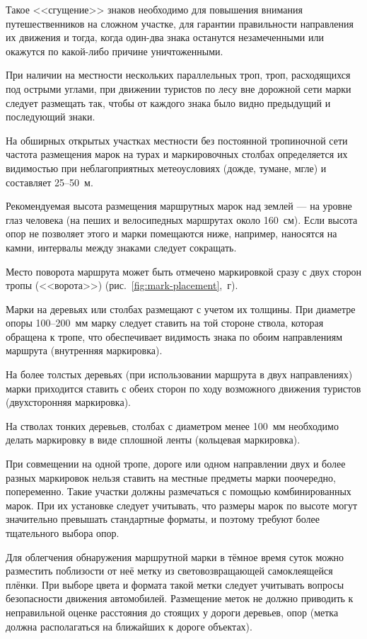 \documentclass[a5paper,10pt,titlepage]{extarticle}
\begin{document}
Такое <<сгущение>> знаков необходимо для повышения внимания путешественников на сложном участке, для гарантии правильности
направления их движения и тогда, когда один-два знака останутся незамеченными или окажутся по какой-либо причине
уничтоженными.

При наличии на местности нескольких параллельных троп, троп, расходящихся под острыми углами, при движении туристов по
лесу вне дорожной сети марки следует размещать так, чтобы от каждого знака было видно предыдущий и последующий знаки.

На обширных открытых участках местности без постоянной тропиночной сети частота размещения марок на турах и
маркировочных столбах определяется их видимостью при неблагоприятных метеоусловиях (дожде, тумане, мгле) и составляет
25--50~м.

Рекомендуемая высота размещения маршрутных марок над землей --- на уровне глаз человека (на пеших и велосипедных маршрутах около 160~см).
Если высота опор не позволяет этого и марки помещаются ниже, например, наносятся на камни, интервалы между знаками
следует сокращать.

Место поворота маршрута может быть отмечено маркировкой сразу с двух сторон тропы (<<ворота>>) (рис.~\ref{fig:mark-placement},~г).

Марки на деревьях или столбах размещают с учетом их толщины. При диаметре опоры 100--200~мм марку следует ставить на той
стороне ствола, которая обращена к тропе, что обеспечивает видимость знака по обоим направлениям маршрута (внутренняя
маркировка).

На более толстых деревьях (при использовании маршрута в двух направлениях) марки приходится ставить с обеих сторон по
ходу возможного движения туристов (двухсторонняя маркировка).

На стволах тонких деревьев, столбах с диаметром менее 100~мм необходимо делать маркировку в виде сплошной ленты
(кольцевая маркировка).

При совмещении на одной тропе, дороге или одном направлении двух и более разных маркировок нельзя ставить на местные
предметы марки поочередно, попеременно. Такие участки должны размечаться с помощью комбинированных марок. При их
установке следует учитывать, что размеры марок по высоте могут значительно превышать стандартные форматы, и поэтому
требуют более тщательного выбора опор.

Для облегчения обнаружения маршрутной марки в тёмное время суток можно разместить поблизости от неё метку из световозвращающей самоклеящейся
плёнки. При выборе цвета и формата такой метки следует учитывать вопросы безопасности движения автомобилей. Размещение
меток не должно приводить к неправильной оценке расстояния до стоящих у дороги деревьев, опор
(метка должна располагаться на ближайших к дороге объектах).
\end{document}
